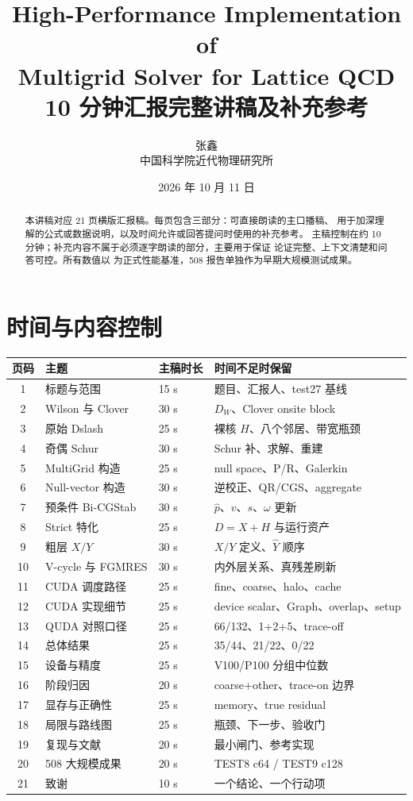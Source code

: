 \documentclass[UTF8,a4paper,11pt,fontset=none]{ctexart}
\title{\bfseries High-Performance Implementation of\\
Multigrid Solver for Lattice QCD\\[0.4em]
\large 10 分钟汇报完整讲稿及补充参考}
\author{张鑫\\中国科学院近代物理研究所}
\date{2026 年 10 月 11 日}
\newcommand{\code}[1]{\texttt{\detokenize{#1}}}
\begin{document}
\maketitle
\thispagestyle{empty}

\begin{abstract}
本讲稿对应 21 页横版汇报稿。每页包含三部分：可直接朗读的主口播稿、
用于加深理解的公式或数据说明，以及时间允许或回答提问时使用的补充参考。
主稿控制在约 10 分钟；补充内容不属于必须逐字朗读的部分，主要用于保证
论证完整、上下文清楚和问答可控。所有数值以 \code{git tag test27}
为正式性能基准，508 报告单独作为早期大规模测试成果。
\end{abstract}

\section*{时间与内容控制}

\begin{center}
\small
\begin{tabular}{@{}clll@{}}
\toprule
页码 & 主题 & 主稿时长 & 时间不足时保留\\
\midrule
1 & 标题与范围 & 15 s & 题目、汇报人、test27 基线\\
2 & Wilson 与 Clover & 30 s & \(D_W\)、Clover onsite block\\
3 & 原始 Dslash & 25 s & 裸核 \(H\)、八个邻居、带宽瓶颈\\
4 & 奇偶 Schur & 30 s & Schur 补、求解、重建\\
5 & MultiGrid 构造 & 25 s & null space、P/R、Galerkin\\
6 & Null-vector 构造 & 30 s & 逆校正、QR/CGS、aggregate\\
7 & 预条件 Bi-CGStab & 30 s & \(\hat p\)、\(v\)、\(s\)、\(\omega\) 更新\\
8 & Strict 特化 & 25 s & \(D=X+H\) 与运行资产\\
9 & 粗层 \(X/Y\) & 30 s & \(X/Y\) 定义、\(\widehat Y\) 顺序\\
10 & V-cycle 与 FGMRES & 30 s & 内外层关系、真残差刷新\\
11 & CUDA 调度路径 & 25 s & fine、coarse、halo、cache\\
12 & CUDA 实现细节 & 25 s & device scalar、Graph、overlap、setup\\
13 & QUDA 对照口径 & 25 s & 66/132、1+2+5、trace-off\\
14 & 总体结果 & 25 s & 35/44、21/22、0/22\\
15 & 设备与精度 & 25 s & V100/P100 分组中位数\\
16 & 阶段归因 & 20 s & coarse+other、trace-on 边界\\
17 & 显存与正确性 & 25 s & memory、true residual\\
18 & 局限与路线图 & 25 s & 瓶颈、下一步、验收门\\
19 & 复现与文献 & 20 s & 最小闸门、参考实现\\
20 & 508 大规模成果 & 20 s & TEST8 c64 / TEST9 c128\\
21 & 致谢 & 10 s & 一个结论、一个行动项\\
\bottomrule
\end{tabular}
\end{center}
\end{document}
